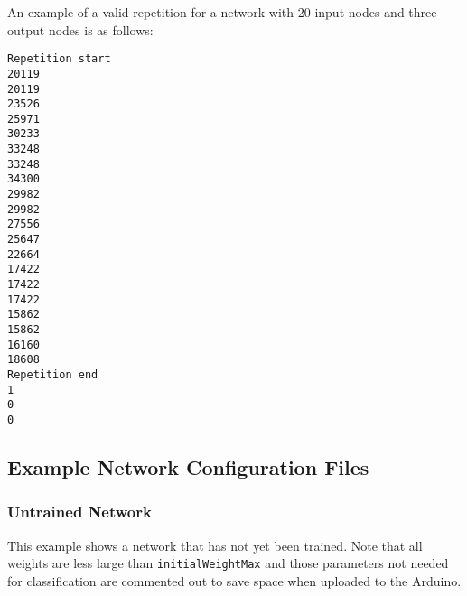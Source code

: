 \documentclass[a4paper]{article}
\begin{document}
An example of a valid repetition for a network with 20 input nodes and three output nodes is as follows:

\begin{lstlisting}
Repetition start
20119
20119
23526
25971
30233
33248
33248
34300
29982
29982
27556
25647
22664
17422
17422
17422
15862
15862
16160
18608
Repetition end
1
0
0
\end{lstlisting}

\subsection{Example Network Configuration Files}%
\label{subsec:a2_configfiles}

\subsubsection{Untrained Network}

This example shows a network that has not yet been trained. Note that all weights are less large than \lstinline{initialWeightMax} and those parameters not needed for classification are commented out to save space when uploaded to the Arduino.
\end{document}
